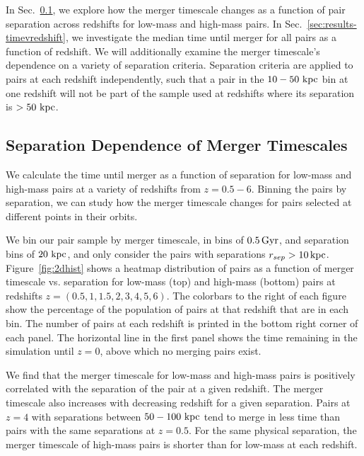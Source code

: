 \documentclass[twocolumn,linenumbers]{aastex631}
\begin{document}
    
    In Sec.~\ref{sec:results-timevsep}, we explore how the merger timescale changes as a function of pair separation across redshifts for low-mass and high-mass pairs. 
    In Sec.~\ref{sec:results-timevredshift}, we investigate the median time until merger for all pairs as a function of redshift. 
    We will additionally examine the merger timescale's dependence on a variety of separation criteria. 
    Separation criteria are applied to pairs at each redshift independently, such that a pair in the $10-50\,\mathrm{\,kpc}$ bin at one redshift will not be part of the sample used at redshifts where its separation is $>50\,\mathrm{\,kpc}$.



\subsection{Separation Dependence of Merger Timescales}\label{sec:results-timevsep}
    We calculate the time until merger as a function of separation for low-mass and high-mass pairs at a variety of redshifts from $z=0.5-6$. 
    Binning the pairs by separation, we can study how the merger timescale changes for pairs selected at different points in their orbits. 
    
    We bin our pair sample by merger timescale, in bins of $0.5\mathrm{\,Gyr}$, and separation bins of $20\,\mathrm{\,kpc}$, and only consider the pairs with separations $r_{sep}>10\mathrm{\,kpc}$.
    Figure~\ref{fig:2dhist} shows a heatmap distribution of pairs as a function of merger timescale vs. separation for low-mass (top) and high-mass (bottom) pairs at redshifts $z=(0.5,1,1.5,2,3,4,5,6)$. 
    The colorbars to the right of each figure show the percentage of the population of pairs at that redshift that are in each bin.
    The number of pairs at each redshift is printed in the bottom right corner of each panel.
    The horizontal line in the first panel shows the time remaining in the simulation until $z=0$, above which no merging pairs exist.
    
    We find that the merger timescale for low-mass and high-mass pairs is positively correlated with the separation of the pair at a given redshift. 
    The merger timescale also increases with decreasing redshift for a given separation.
    Pairs at $z=4$ with separations between $50-100\,\mathrm{\,kpc}$ tend to merge in less time than pairs with the same separations at $z=0.5$. 
    For the same physical separation, the merger timescale of high-mass pairs is shorter than for low-mass at each redshift. 
    
\end{document}
